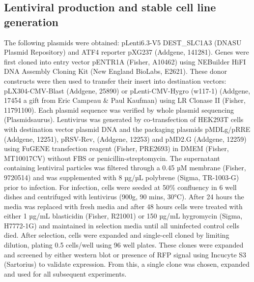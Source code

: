 

\subsection{Lentiviral production and stable cell line generation}
The following plasmids were obtained: pLenti6.3-V5 DEST\_SLC1A3 (DNASU Plasmid Repository) and ATF4 reporter pXG237 (Addgene, 141281).
Genes were first cloned into entry vector pENTR1A (Fisher, A10462) using NEBuilder HiFI DNA Assembly Cloning Kit (New England BioLabs, E2621).
These donor constructs were then used to transfer their insert into destination vectors: pLX304-CMV-Blast (Addgene, 25890) or pLenti-CMV-Hygro (w117-1) (Addgene, 17454 a gift from Eric Campeau \& Paul Kaufman) using LR Clonase II (Fisher, 11791100).
Each plasmid sequence was verified by whole plasmid sequencing (Plasmidsaurus).
Lentivirus was generated by co-transfection of HEK293T cells with destination vector plasmid DNA and the packaging plasmids pMDLg/pRRE (Addgene, 12251), pRSV-Rev, (Addgene, 12253) and pMD2.G (Addgene, 12259) using FuGENE transfection reagent (Fisher, PRE2693) in DMEM (Fisher, MT10017CV) without FBS or penicillin-streptomycin.
The supernatant containing lentiviral particles was filtered through a 0.45 µM membrane (Fisher, 9720514) and was supplemented with 8 µg/µL polybrene (Sigma, TR-1003-G) prior to infection.
For infection, cells were seeded at 50\% confluency in 6 well dishes and centrifuged with lentivirus (900g, 90 mins, 30°C).
After 24 hours the media was replaced with fresh media and after 48 hours cells were treated with either 1 µg/mL blasticidin (Fisher, R21001) or 150 µg/mL hygromycin (Sigma, H7772-1G) and maintained in selection media until all uninfected control cells died.
After selection, cells were expanded and single-cell cloned by limiting dilution, plating 0.5 cells/well using 96 well plates.
These clones were expanded and screened by either western blot or presence of RFP signal using Incucyte S3 (Sartorius) to validate expression.
From this, a single clone was chosen, expanded and used for all subsequent experiments.


